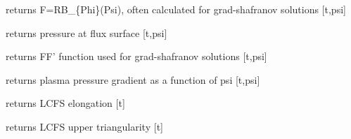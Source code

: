 \documentclass[letterpaper,10pt,english]{sphinxmanual}
\begin{document}
\begin{fulllineitems}

\begin{fulllineitems}
\label{eqtools:eqtools.EFIT.EFITTree.getF}
returns F=RB\_\{Phi\}(Psi), often calculated for grad-shafranov solutions  {[}t,psi{]}

\end{fulllineitems}


\begin{fulllineitems}
\label{eqtools:eqtools.EFIT.EFITTree.getFluxPres}
returns pressure at flux surface {[}t,psi{]}

\end{fulllineitems}


\begin{fulllineitems}
\label{eqtools:eqtools.EFIT.EFITTree.getFFPrime}
returns FF' function used for grad-shafranov solutions {[}t,psi{]}

\end{fulllineitems}


\begin{fulllineitems}
\label{eqtools:eqtools.EFIT.EFITTree.getPPrime}
returns plasma pressure gradient as a function of psi {[}t,psi{]}

\end{fulllineitems}


\begin{fulllineitems}
\label{eqtools:eqtools.EFIT.EFITTree.getElongation}
returns LCFS elongation {[}t{]}

\end{fulllineitems}


\begin{fulllineitems}
\label{eqtools:eqtools.EFIT.EFITTree.getUpperTriangularity}
returns LCFS upper triangularity {[}t{]}


\end{fulllineitems}
\end{fulllineitems}
\end{document}
